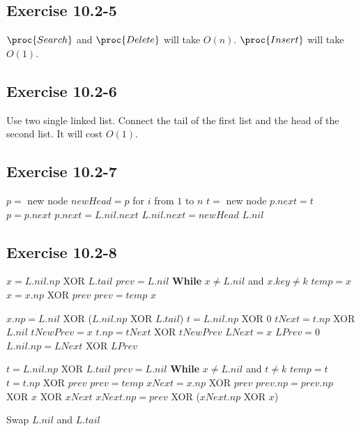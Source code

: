 \documentclass[12pt]{article}
\theoremstyle{definition}
\theoremstyle{remark}
\begin{document}
\subsection*{Exercise 10.2-5}
$\proc{Search}$ and $\proc{Delete}$ will take $O(n)$. $\proc{Insert}$ will take $O(1)$.
\subsection*{Exercise 10.2-6}
Use two single linked list. Connect the tail of the first list and the head of the second list. It will cost $O(1)$.
\subsection*{Exercise 10.2-7}
\begin{codebox}
\li $p=$ new node
\li $newHead=p$
\li for $i$ from $1$ to $n$
\li \quad $t=$ new node
\li \quad $p.next=t$
\li \quad $p=p.next$
\li $p.next=L.nil.next$
\li $L.nil.next=newHead$
\li \Return $L.nil$
\end{codebox}
\subsection*{Exercise 10.2-8}
\begin{codebox}
\li $x=L.nil.np$ XOR $L.tail$
\li $prev=L.nil$
\li \textbf{While} $x\not=L.nil$ and $x.key\not=k$
\li \quad $temp=x$
\li \quad $x=x.np$ XOR $prev$
\li \quad $prev=temp$
\li \Return $x$
\end{codebox}
\begin{codebox}
\li $x.np=L.nil$ XOR ($L.nil.np$ XOR $L.tail$)
\li $t=L.nil.np$ XOR $0$
\li $tNext=t.np$ XOR $L.nil$
\li $tNewPrev=x$
\li $t.np=tNext$ XOR $tNewPrev$
\li $LNext=x$
\li $LPrev=0$
\li $L.nil.np=LNext$ XOR $LPrev$
\end{codebox}
\begin{codebox}
\li $t=L.nil.np$ XOR $L.tail$
\li $prev=L.nil$
\li \textbf{While} $x\not=L.nil$ and $t\not=k$
\li \quad $temp=t$
\li \quad $t=t.np$ XOR $prev$
\li \quad $prev=temp$
\li $xNext=x.np$ XOR $prev$
\li $prev.np=prev.np$ XOR $x$ XOR $xNext$
\li $xNext.np=prev$ XOR ($xNext.np$ XOR $x$)
\end{codebox}
\begin{codebox}
\li Swap $L.nil$ and $L.tail$
\end{codebox}
\end{document}
